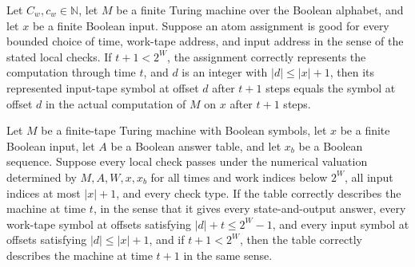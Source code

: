 \begin{theorem}
\label{Complexity.Meyer.input_correct}
\leanok
{}
Let $C_w,c_w\in\mathbb{N}$, let $M$ be a finite Turing machine over the Boolean
alphabet, and let $x$ be a finite Boolean input. Suppose an atom assignment is good for
every bounded choice of time, work-tape address, and input address in the sense of the
stated local checks. If $t+1<2^W$, the assignment correctly represents the computation
through time $t$, and $d$ is an integer with $|d|\le |x|+1$, then its represented
input-tape symbol at offset $d$ after $t+1$ steps equals the symbol at offset $d$ in the
actual computation of $M$ on $x$ after $t+1$ steps.
\end{theorem}

\begin{theorem}
\label{Complexity.Meyer.correct_succ}
\leanok
{}
Let $M$ be a finite-tape Turing machine with Boolean symbols, let $x$ be a finite
Boolean input, let $A$ be a Boolean answer table, and let $x_b$ be a Boolean sequence.
Suppose every local check passes under the numerical valuation determined by
$M,A,W,x,x_b$ for all times and work indices below $2^W$, all input indices at most
$|x|+1$, and every check type. If the table correctly describes the machine at time $t$,
in the sense that it gives every state-and-output answer, every work-tape symbol at
offsets satisfying $|d|+t\le 2^W-1$, and every input symbol at offsets satisfying
$|d|\le |x|+1$, and if $t+1<2^W$, then the table correctly describes the machine at time
$t+1$ in the same sense.
\end{theorem}

